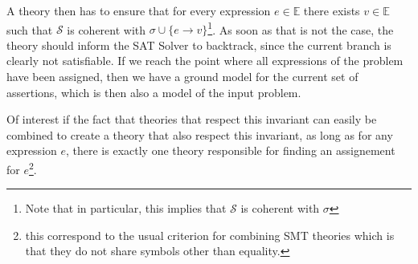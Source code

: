 A theory then has to ensure that for every expression $e \in \mathbb{E}$
there exists $v \in \mathbb{E}$ such that $\mathcal{S}$ is coherent with
$\sigma \cup \{ e \rightarrow v \}$\footnote{Note that in particular, this implies
that $\mathcal{S}$ is coherent with $\sigma$}. As soon as that is not the case, the theory
should inform the SAT Solver to backtrack, since the current branch is clearly not satisfiable.
If we reach the point where all expressions of the problem have been assigned, then we
have a ground model for the current set of assertions, which is then also a model
of the input problem.

Of interest if the fact that theories that respect this invariant can easily be combined
to create a theory that also respect this invariant, as long as for any expression $e$,
there is exactly one theory responsible for finding an assignement for $e$\footnote{this
correspond to the usual criterion for combining SMT theories which is that they do not
share symbols other than equality.}.


